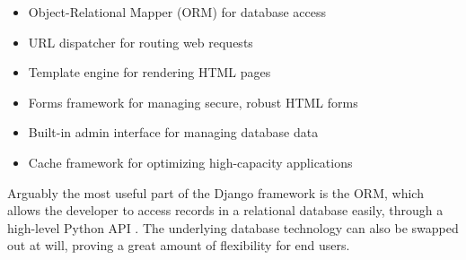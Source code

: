 \begin{itemize}
    \item Object-Relational Mapper (ORM) for database access
    \item URL dispatcher for routing web requests
    \item Template engine for rendering HTML pages
    \item Forms framework for managing secure, robust HTML forms
    \item Built-in admin interface for managing database data
    \item Cache framework for optimizing high-capacity applications
\end{itemize}

Arguably the most useful part of the Django framework is the ORM, which allows
the developer to access records in a relational database easily, through
a high-level Python API \cite{plekhanova2009}. The underlying database
technology can also be swapped out at will, proving a great amount of
flexibility for end users.
